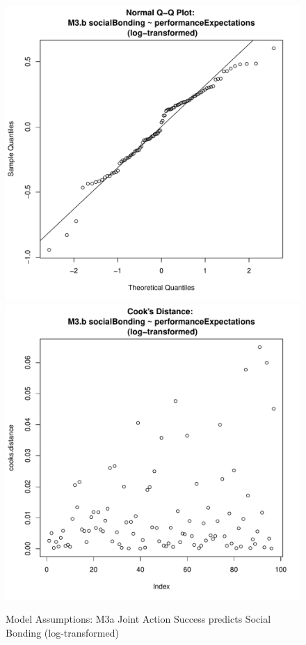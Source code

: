 {\begin{figure}[htbp]
  \includegraphics[scale =.4]{images/MLM3bLogQQNorm.pdf}
  \includegraphics[scale =.4]{images/MLM3bLogCooksD.pdf}
  \caption{Model Assumptions: M3a Joint Action Success predicts Social Bonding (log-transformed)}
  \label{fig:MLM3bLogAssumptions}
\end{figure}






}
